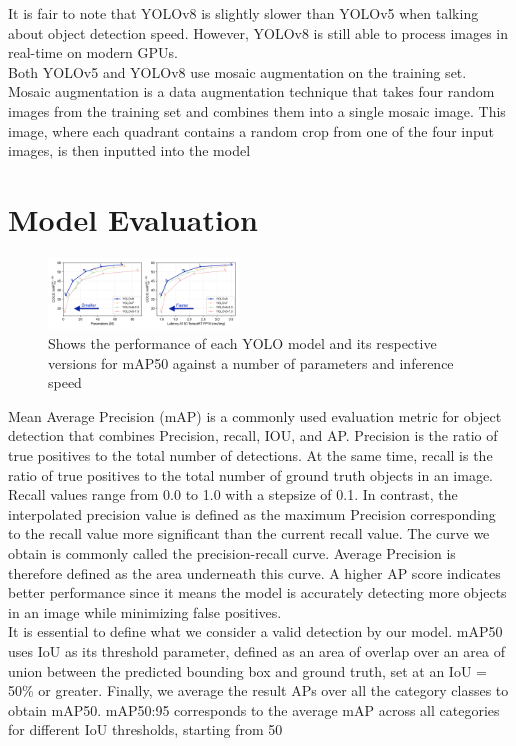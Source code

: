 \documentclass[10pt,twocolumn,letterpaper]{article}
\begin{document}
It is fair to note that YOLOv8 is slightly slower than YOLOv5 when talking about object detection speed. However, YOLOv8 is still able to process images in real-time on modern GPUs.\\
Both YOLOv5 and YOLOv8 use mosaic augmentation on the training set. Mosaic augmentation is a data augmentation technique that takes four random images from the training set and combines them into a single mosaic image. This image, where each quadrant contains a random crop from one of the four input images, is then inputted into the model ~\cite{MosaicAug}
\section{Model Evaluation}

\begin{figure}[h]
    \centering
    \includegraphics[width=0.45\textwidth]{figures/yolo-comparison-plots.png}
    \caption{Shows the performance of each YOLO model and its respective versions for mAP50 against a number of parameters and inference speed}
    \label{fig:my_label}
\end{figure}

Mean Average Precision (mAP) is a commonly used evaluation metric for object detection that combines Precision, recall, IOU, and AP. Precision is the ratio of true positives to the total number of detections. At the same time, recall is the ratio of true positives to the total number of ground truth objects in an image. Recall values range from 0.0 to 1.0 with a stepsize of 0.1. In contrast, the interpolated precision value is defined as the maximum Precision corresponding to the recall value more significant than the current recall value. The curve we obtain is commonly called the precision-recall curve. Average Precision is therefore defined as the area underneath this curve. A higher AP score indicates better performance since it means the model is accurately detecting more objects in an image while minimizing false positives.\\
It is essential to define what we consider a valid detection by our model. mAP50 uses IoU as its threshold parameter, defined as an area of overlap over an area of union between the predicted bounding box and ground truth, set at an IoU = 50\% or greater. Finally, we average the result APs over all the category classes to obtain mAP50. mAP50:95 corresponds to the average mAP across all categories for different IoU thresholds, starting from 50%
\end{document}

